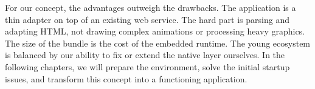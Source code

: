 \noindent For our concept, the advantages outweigh the drawbacks. The application is a thin
adapter on top of an existing web service. The hard part is parsing and adapting HTML, not
drawing complex animations or processing heavy graphics. The size of the bundle is the cost of
the embedded runtime. The young ecosystem is balanced by our ability to fix or extend the native
layer ourselves. In the following chapters, we will prepare the environment, solve the initial
startup issues, and transform this concept into a functioning application.
